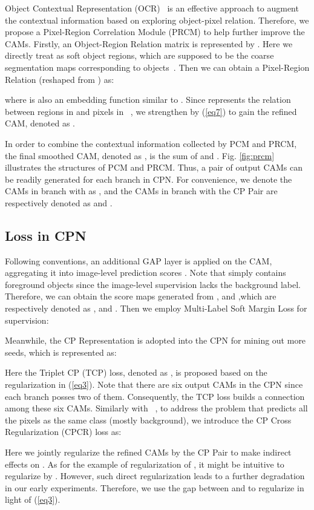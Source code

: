 \documentclass[10pt,twocolumn,letterpaper]{article}
\begin{document}
Object Contextual Representation (OCR)~\cite{OCR} is an effective approach to augment the contextual information based on exploring object-pixel relation. Therefore, we propose a Pixel-Region Correlation Module (PRCM) to help further improve the CAMs. Firstly, an Object-Region Relation matrix  is represented by . Here we directly treat  as soft object regions, which are supposed to be the coarse segmentation maps corresponding to  objects~\cite{OCR}. Then we can obtain a Pixel-Region Relation  (reshaped from ) as:


where  is also an embedding function similar to . Since  represents the relation between regions in  and pixels in ~\cite{OCR}, we strengthen  by (\ref{eq7}) to gain the refined CAM, denoted as .

In order to combine the contextual information collected by PCM and PRCM, the final smoothed CAM, denoted as , is the sum of  and . Fig. \ref{fig:prcm} illustrates the structures of PCM and PRCM. Thus, a pair of output CAMs  can be readily generated for each branch in CPN. For convenience, we denote the CAMs in branch with  as , and the CAMs in branch with the CP Pair are respectively denoted as  and .
\subsection{Loss in CPN}
Following conventions, an additional GAP layer is applied on the CAM, aggregating it into image-level prediction scores . Note that  simply contains  foreground objects since the image-level supervision lacks the background label. Therefore, we can obtain the score maps generated from ,  and ,which are respectively denoted as , and . Then we employ Multi-Label Soft Margin Loss  for supervision:


Meanwhile, the CP Representation is adopted into the CPN for mining out more seeds, which is represented as:

Here the Triplet CP (TCP) loss, denoted as , is proposed based on the regularization in (\ref{eq3}). Note that there are six output CAMs in the CPN since each branch posses two of them. Consequently, the TCP loss builds a connection among these six CAMs. Similarly with ~\cite{seam}, to address the problem that  predicts all the pixels as the same class (mostly background), we introduce the CP Cross Regularization (CPCR) loss as:

Here we jointly regularize the refined CAMs by the CP Pair to make indirect effects on . As for the example of regularization of , it might be intuitive to regularize  by . However, such direct regularization leads to a further degradation in our early experiments. Therefore, we use the gap between  and  to regularize  in light of (\ref{eq3}).
\end{document}
